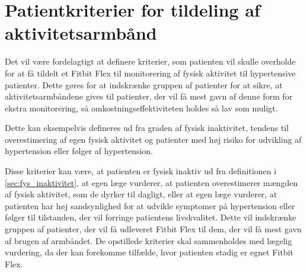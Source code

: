 \section{Patientkriterier for tildeling af aktivitetsarmbånd} \label{sec:kriterier}

Det vil være fordelagtigt at definere kriterier, som patienten vil skulle overholde for at få tildelt et Fitbit Flex til monitorering af fysisk aktivitet til hypertensive patienter. Dette gøres for at indskrænke gruppen af patienter for at sikre, at aktivitetsarmbåndene gives til patienter, der vil få mest gavn af denne form for ekstra monitorering, så omkostningseffektiviteten holdes så lav som muligt.

Dette kan eksempelvis defineres ud fra graden af fysisk inaktivitet, tendens til overestimering af egen fysisk aktivitet og patienter med høj risiko for udvikling af hypertension eller følger af hypertension. 

Disse kriterier kan være, at patienten er fysisk inaktiv ud fra definitionen i \autoref{sec:fys_inaktivitet}, at egen læge vurderer, at patienten overestimerer mængden af fysisk aktivitet, som de dyrker til dagligt, eller at egen læge vurderer, at patienten har høj sandsynlighed for at udvikle symptomer på hypertension eller følger til tilstanden, der vil forringe patientens livskvalitet. Dette vil indskrænke gruppen af patienter, der vil få udleveret Fitbit Flex til dem, der vil få mest gavn af brugen af armbåndet. 
De opstillede kriterier skal sammenholdes med lægelig vurdering, da der kan forekomme tilfælde, hvor patienten stadig er egnet Fitbit Flex. 

